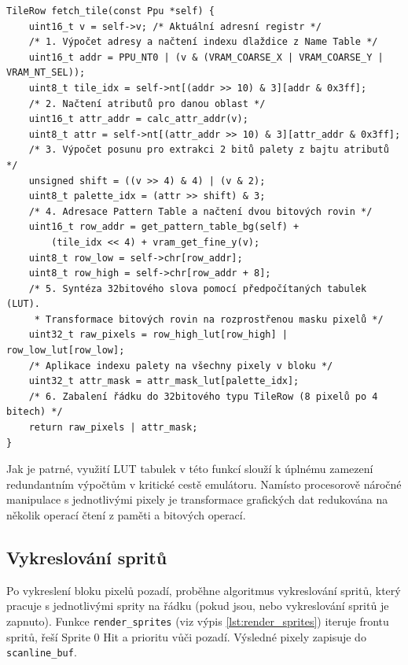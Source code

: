\begin{listing}[htbp]
\begin{verbatim}
TileRow fetch_tile(const Ppu *self) {
    uint16_t v = self->v; /* Aktuální adresní registr */
    /* 1. Výpočet adresy a načtení indexu dlaždice z Name Table */
    uint16_t addr = PPU_NT0 | (v & (VRAM_COARSE_X | VRAM_COARSE_Y | VRAM_NT_SEL));
    uint8_t tile_idx = self->nt[(addr >> 10) & 3][addr & 0x3ff];
    /* 2. Načtení atributů pro danou oblast */
    uint16_t attr_addr = calc_attr_addr(v);
    uint8_t attr = self->nt[(attr_addr >> 10) & 3][attr_addr & 0x3ff];
    /* 3. Výpočet posunu pro extrakci 2 bitů palety z bajtu atributů */
    unsigned shift = ((v >> 4) & 4) | (v & 2);
    uint8_t palette_idx = (attr >> shift) & 3;
    /* 4. Adresace Pattern Table a načtení dvou bitových rovin */
    uint16_t row_addr = get_pattern_table_bg(self) +
        (tile_idx << 4) + vram_get_fine_y(v);
    uint8_t row_low = self->chr[row_addr];
    uint8_t row_high = self->chr[row_addr + 8];
    /* 5. Syntéza 32bitového slova pomocí předpočítaných tabulek (LUT).
     * Transformace bitových rovin na rozprostřenou masku pixelů */
    uint32_t raw_pixels = row_high_lut[row_high] | row_low_lut[row_low];
    /* Aplikace indexu palety na všechny pixely v bloku */
    uint32_t attr_mask = attr_mask_lut[palette_idx];
    /* 6. Zabalení řádku do 32bitového typu TileRow (8 pixelů po 4 bitech) */
    return raw_pixels | attr_mask;
}
\end{verbatim}
\caption{Extrakce řádku dlaždice a následná jeho syntézu do 32bitového typu \texttt{TileRow} pomocí
LUT.}
\label{lst:fetch_tile}
\end{listing}

Jak je patrné, využití LUT tabulek v této funkcí slouží k úplnému zamezení redundantním výpočtům v
kritické cestě emulátoru. Namísto procesorově náročné manipulace s jednotlivými pixely je
transformace grafických dat redukována na několik operací čtení z paměti a bitových operací.

\subsection{Vykreslování spritů}

Po vykreslení bloku pixelů pozadí, proběhne algoritmus vykreslování spritů, který pracuje s
jednotlivými sprity na řádku (pokud jsou, nebo vykreslování spritů je zapnuto). Funkce
\texttt{render\_sprites} (viz výpis \ref{lst:render_sprites}) iteruje frontu spritů, řeší Sprite 0
Hit a prioritu vůči pozadí. Výsledné pixely zapisuje do \texttt{scanline\_buf}.

